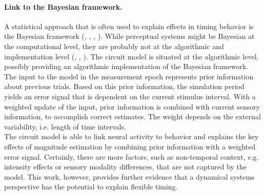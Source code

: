 \documentclass[10pt, a4paper]{article}
\begin{document}
\paragraph{Link to the Bayesian framework.}
A statistical approach that is often used to explain effects in timing behavior is the Bayesian framework (\cite{Petzschner2012}, \cite{Shi2013}, \cite{Petzschner2015}, \cite{Sohn2019}).
While perceptual systems might be Bayesian at the computational level, they are probably not at the algorithmic and implementation level (\cite{marr1976}, \cite{Block2018}, \cite{Kwisthout2020}).
The circuit model is situated at the algorithmic level, possibly providing an algorithmic implementation of the Bayesian framework. %
The input to the model in the measurement epoch represents prior information about previous trials. 
Based on this prior information, the simulation period yields an error signal that is dependent on the current stimulus interval. 
With a weighted update of the input, prior information is combined with current sensory information, to accomplish correct estimates. 
The weight depends on the external variability, i.e. length of time intervals. \\

\noindent The circuit model is able to link neural activity to behavior and explains the key effects of magnitude estimation by combining prior information with a weighted error signal. 
Certainly, there are more factors, such as non-temporal context, e.g. intensity effects or sensory modality differences, that are not captured by the model.
This work, however, provides further evidence that a dynamical systems perspective has the potential to explain flexible timing.


\end{document}
